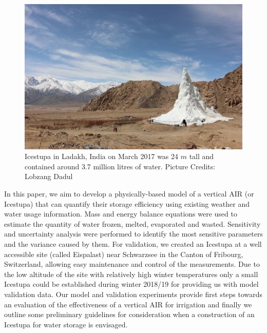 \documentclass[utf8]{frontiersSCNS} %
\begin{document}
  \begin{figure}
  \begin{center}
    \includegraphics[width=10 cm]{Figures/Figure_1.jpg}
  \end{center}
  \caption{Icestupa in Ladakh, India on March 2017 was 24 $m$ tall and contained around 3.7 million litres of water. Picture Credits: Lobzang Dadul}
  \label{fig:cone}
  \end{figure}
  

In this paper, we aim to develop a physically-based model of a vertical AIR (or Icestupa) that can quantify their storage efficiency using existing weather and water usage information. Mass and energy balance equations were used to estimate the quantity of water frozen, melted, evaporated and wasted. Sensitivity and uncertainty analysis were performed to identify the most sensitive parameters and the variance caused by them. For validation, we created an Icestupa at a well accessible site (called Eispalast) near Schwarzsee in the Canton of Fribourg, Switzerland, allowing easy maintenance and control of the measurements. Due to the low altitude of the site with relatively high winter temperatures only a small Icestupa could be established during winter 2018/19 for providing us with model validation data. Our model and validation experiments provide first steps towards an evaluation of the effectiveness of a vertical AIR for irrigation and finally we outline some preliminary guidelines for consideration when a construction of an Icestupa for water storage is envisaged.
\end{document}
